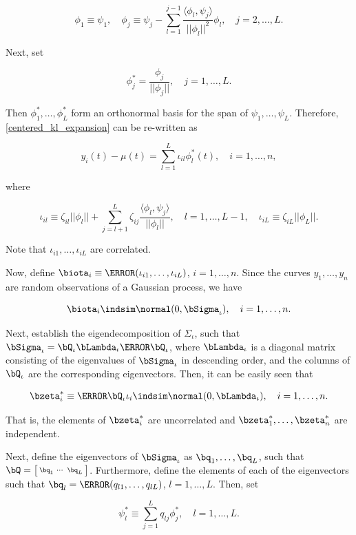 \documentclass[12pt]{article}
\theoremstyle{plain}
\theoremstyle{definition}
\theoremstyle{remark}
\begin{document}
\[
	\phi_1 \equiv \psi_1, \quad
	\phi_j \equiv \psi_j - \sum_{l=1}^{j-1} \frac{\langle \phi_l, \psi_j \rangle}{|| \phi_l ||^2} \phi_l, \quad j = 2, \dots, L.
\]

\noindent Next, set

\[
	\phi^*_j = \frac{\phi_j}{|| \phi_j ||}, \quad j = 1, \dots, L.
\]

\noindent Then $\phi^*_1, \dots, \phi^*_L$ form an orthonormal basis for the span of $\psi_1, \dots, \psi_L$. Therefore,
\eqref{centered_kl_expansion} can be re-written as

\[
	y_i (t) - \mu (t) = \sum_{l=1}^L \iota_{il} \phi^*_l (t), \quad i = 1, \dots, n,
\]

\noindent where

\[
	\iota_{il} \equiv \zeta_{il} ||\phi_l|| + \sum_{j=l+1}^L \zeta_{ij} \frac{\langle \phi_l , \psi_j \rangle}{||\phi_l||}, \quad
	l = 1, \dots, L-1, \quad
	\iota_{iL} \equiv \zeta_{iL} ||\phi_L||.
\]

\noindent Note that $\iota_{i1}, \dots, \iota_{iL}$ are correlated.

Now, define $\biota_i \equiv \T{(\iota_{i1}, \dots, \iota_{iL})}$, $i = 1, \dots, n$. Since the curves $y_1, \dots, y_n$ are
random observations of a Gaussian process, we have

\[
	\biota_i \indsim \normal (0, \bSigma_\iota), \quad i = 1, \dots, n.
\]

\noindent Next, establish the eigendecomposition of $\Sigma_\iota$, such
that $\bSigma_\iota = \bQ_\iota \bLambda_\iota \T{\bQ_\iota}$, where $\bLambda_\iota$
is a diagonal matrix consisting of the eigenvalues of
$\bSigma_\iota$ in descending order, and the columns of $\bQ_\iota$
are the corresponding eigenvectors. Then, it can be easily seen that

\[
	\bzeta^*_i \equiv \T{\bQ_\iota} \iota_i \indsim \normal (0, \bLambda_\iota), \quad i = 1, \dots, n.
\]

\noindent That is, the elements of $\bzeta^*_i$ are uncorrelated and $\bzeta^*_1, \dots, \bzeta^*_n$ are independent.

Next, define the eigenvectors of $\bSigma_\iota$ as $\bq_1, \dots, \bq_L$, such that $\bQ = \bigl[
\begin{smallmatrix} \bq_1 & \cdots & \bq_L \end{smallmatrix} \bigr]$. Furthermore, define the elements of each of
the eigenvectors such that $\bq_l = \T{( q_{l1}, \dots, q_{lL} )}$, $l = 1, \dots, L$. Then, set

\[
	\psi^*_l \equiv \sum_{j=1}^L q_{lj} \phi^*_j, \quad l = 1, \dots, L.
\]
\end{document}
